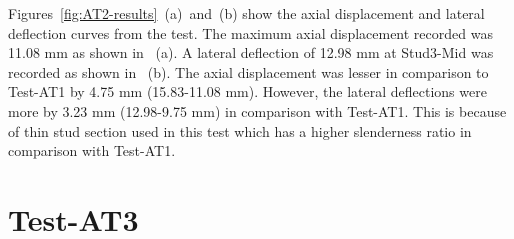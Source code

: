 Figures~\ref{fig:AT2-results}~(a)~and~(b) show the axial displacement and lateral deflection curves from the test. The maximum axial displacement recorded was 11.08 mm as shown in ~(a). A lateral deflection of 12.98 mm at Stud3-Mid was recorded as shown in ~(b). The axial displacement was lesser in comparison to Test-AT1 by 4.75 mm (15.83-11.08 mm). However, the lateral deflections were more by 3.23 mm (12.98-9.75 mm) in comparison with Test-AT1. This is because of thin stud section used in this test which has a higher slenderness ratio in comparison with Test-AT1. 

\section{Test-AT3}\label{sec:AT3}

